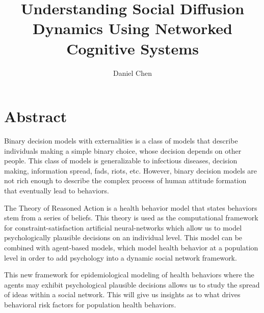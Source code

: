 \documentclass[10pt,letterpaper]{article}
\author{Daniel Chen}
\date{}
\title{Understanding Social Diffusion Dynamics Using Networked Cognitive Systems}
\begin{document}
    \maketitle
    
    \section*{Abstract}

    Binary decision models with externalities is a class of models that describe
    individuals making a simple binary choice, whose decision depends on other people.
    This class of models is generalizable to infectious diseases, decision making, information spread, fads, riots, etc.
    However, binary decision models are not rich enough to describe the complex process of human attitude formation that eventually lead to behaviors.
    
    The Theory of Reasoned Action is a health behavior model that states behaviors stem from a series of beliefs.
    This theory is used as the computational framework for constraint-satisfaction artificial neural-networks
    which allow us to model psychologically plausible decisions on an individual level.
    This model can be combined with agent-based models, which model health behavior at a population level in order to add psychology into a dynamic social network framework.
    
    This new framework for epidemiological modeling of health behaviors where the agents may exhibit psychological plausible decisions allows us to study the spread of ideas within a social network.
    This will give us insights as to what drives behavioral risk factors for population health behaviors.
\end{document}
